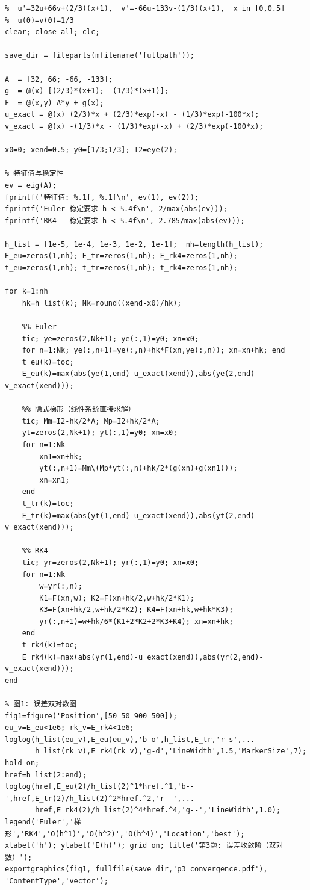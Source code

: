 \documentclass[UTF8,a4paper,11pt]{article}
\begin{document}
\begin{lstlisting}[style=matlab, caption={\texttt{problem3.m}：刚性方程组—— Euler / 隐式梯形 / RK4 比较}]
%% problem3.m  第五章上机第3题
%  u'=32u+66v+(2/3)(x+1),  v'=-66u-133v-(1/3)(x+1),  x in [0,0.5]
%  u(0)=v(0)=1/3
clear; close all; clc;

save_dir = fileparts(mfilename('fullpath'));

A  = [32, 66; -66, -133];
g  = @(x) [(2/3)*(x+1); -(1/3)*(x+1)];
F  = @(x,y) A*y + g(x);
u_exact = @(x) (2/3)*x + (2/3)*exp(-x) - (1/3)*exp(-100*x);
v_exact = @(x) -(1/3)*x - (1/3)*exp(-x) + (2/3)*exp(-100*x);

x0=0; xend=0.5; y0=[1/3;1/3]; I2=eye(2);

% 特征值与稳定性
ev = eig(A);
fprintf('特征值: %.1f, %.1f\n', ev(1), ev(2));
fprintf('Euler 稳定要求 h < %.4f\n', 2/max(abs(ev)));
fprintf('RK4   稳定要求 h < %.4f\n', 2.785/max(abs(ev)));

h_list = [1e-5, 1e-4, 1e-3, 1e-2, 1e-1];  nh=length(h_list);
E_eu=zeros(1,nh); E_tr=zeros(1,nh); E_rk4=zeros(1,nh);
t_eu=zeros(1,nh); t_tr=zeros(1,nh); t_rk4=zeros(1,nh);

for k=1:nh
    hk=h_list(k); Nk=round((xend-x0)/hk);

    %% Euler
    tic; ye=zeros(2,Nk+1); ye(:,1)=y0; xn=x0;
    for n=1:Nk; ye(:,n+1)=ye(:,n)+hk*F(xn,ye(:,n)); xn=xn+hk; end
    t_eu(k)=toc;
    E_eu(k)=max(abs(ye(1,end)-u_exact(xend)),abs(ye(2,end)-v_exact(xend)));

    %% 隐式梯形（线性系统直接求解）
    tic; Mm=I2-hk/2*A; Mp=I2+hk/2*A;
    yt=zeros(2,Nk+1); yt(:,1)=y0; xn=x0;
    for n=1:Nk
        xn1=xn+hk;
        yt(:,n+1)=Mm\(Mp*yt(:,n)+hk/2*(g(xn)+g(xn1)));
        xn=xn1;
    end
    t_tr(k)=toc;
    E_tr(k)=max(abs(yt(1,end)-u_exact(xend)),abs(yt(2,end)-v_exact(xend)));

    %% RK4
    tic; yr=zeros(2,Nk+1); yr(:,1)=y0; xn=x0;
    for n=1:Nk
        w=yr(:,n);
        K1=F(xn,w); K2=F(xn+hk/2,w+hk/2*K1);
        K3=F(xn+hk/2,w+hk/2*K2); K4=F(xn+hk,w+hk*K3);
        yr(:,n+1)=w+hk/6*(K1+2*K2+2*K3+K4); xn=xn+hk;
    end
    t_rk4(k)=toc;
    E_rk4(k)=max(abs(yr(1,end)-u_exact(xend)),abs(yr(2,end)-v_exact(xend)));
end

% 图1: 误差双对数图
fig1=figure('Position',[50 50 900 500]);
eu_v=E_eu<1e6; rk_v=E_rk4<1e6;
loglog(h_list(eu_v),E_eu(eu_v),'b-o',h_list,E_tr,'r-s',...
       h_list(rk_v),E_rk4(rk_v),'g-d','LineWidth',1.5,'MarkerSize',7);
hold on;
href=h_list(2:end);
loglog(href,E_eu(2)/h_list(2)^1*href.^1,'b--',href,E_tr(2)/h_list(2)^2*href.^2,'r--',...
       href,E_rk4(2)/h_list(2)^4*href.^4,'g--','LineWidth',1.0);
legend('Euler','梯形','RK4','O(h^1)','O(h^2)','O(h^4)','Location','best');
xlabel('h'); ylabel('E(h)'); grid on; title('第3题: 误差收敛阶（双对数）');
exportgraphics(fig1, fullfile(save_dir,'p3_convergence.pdf'), 'ContentType','vector');


\end{lstlisting}
\end{document}
